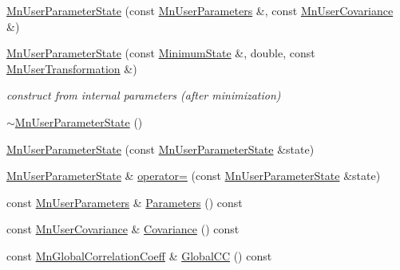 \begin{DoxyCompactItemize}
\item 
\mbox{\hyperlink{classROOT_1_1Minuit2_1_1MnUserParameterState_aafeef85943691c9736a58d6a7830259a}{Mn\+User\+Parameter\+State}} (const \mbox{\hyperlink{classROOT_1_1Minuit2_1_1MnUserParameters}{Mn\+User\+Parameters}} \&, const \mbox{\hyperlink{classROOT_1_1Minuit2_1_1MnUserCovariance}{Mn\+User\+Covariance}} \&)
\item 
\mbox{\hyperlink{classROOT_1_1Minuit2_1_1MnUserParameterState_a8214c3f41958849f1aaae4865bb5b129}{Mn\+User\+Parameter\+State}} (const \mbox{\hyperlink{classROOT_1_1Minuit2_1_1MinimumState}{Minimum\+State}} \&, double, const \mbox{\hyperlink{classROOT_1_1Minuit2_1_1MnUserTransformation}{Mn\+User\+Transformation}} \&)
\begin{DoxyCompactList}\small\item\em construct from internal parameters (after minimization) \end{DoxyCompactList}\item 
\mbox{\hyperlink{classROOT_1_1Minuit2_1_1MnUserParameterState_a3a5a64a086b883f61febd02676c0d151}{$\sim$\+Mn\+User\+Parameter\+State}} ()
\item 
\mbox{\hyperlink{classROOT_1_1Minuit2_1_1MnUserParameterState_aee3f88d39b420cc5451d862ac6b543fe}{Mn\+User\+Parameter\+State}} (const \mbox{\hyperlink{classROOT_1_1Minuit2_1_1MnUserParameterState}{Mn\+User\+Parameter\+State}} \&state)
\item 
\mbox{\hyperlink{classROOT_1_1Minuit2_1_1MnUserParameterState}{Mn\+User\+Parameter\+State}} \& \mbox{\hyperlink{classROOT_1_1Minuit2_1_1MnUserParameterState_af46ca603e05f41605057359254f02470}{operator=}} (const \mbox{\hyperlink{classROOT_1_1Minuit2_1_1MnUserParameterState}{Mn\+User\+Parameter\+State}} \&state)
\item 
const \mbox{\hyperlink{classROOT_1_1Minuit2_1_1MnUserParameters}{Mn\+User\+Parameters}} \& \mbox{\hyperlink{classROOT_1_1Minuit2_1_1MnUserParameterState_a486a8fc38e1581efd228ed43604e3fa7}{Parameters}} () const
\item 
const \mbox{\hyperlink{classROOT_1_1Minuit2_1_1MnUserCovariance}{Mn\+User\+Covariance}} \& \mbox{\hyperlink{classROOT_1_1Minuit2_1_1MnUserParameterState_a0e8ae6fe41fbc8eb1c218742ed080e0e}{Covariance}} () const
\item 
const \mbox{\hyperlink{classROOT_1_1Minuit2_1_1MnGlobalCorrelationCoeff}{Mn\+Global\+Correlation\+Coeff}} \& \mbox{\hyperlink{classROOT_1_1Minuit2_1_1MnUserParameterState_a92905c9d64bbd5367b339826ca358ee8}{Global\+CC}} () const
\item 

\end{DoxyCompactItemize}
